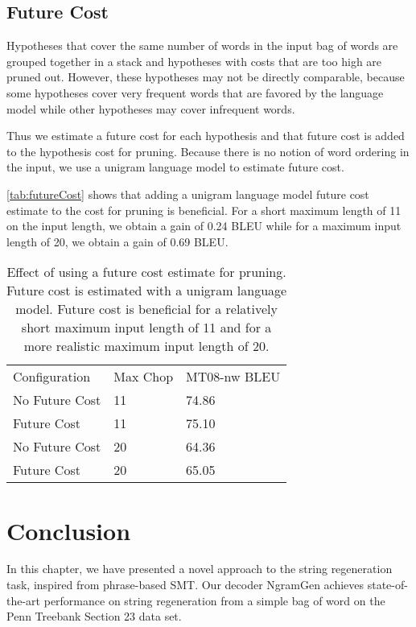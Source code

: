 \subsection{Future Cost}
\label{sec:gytoFutureCost}

Hypotheses that cover the same number of words in the input
bag of words are grouped together in a stack and
hypotheses with costs that are too high are pruned out.
However, these hypotheses may not be directly comparable, because
some hypotheses cover very frequent words that are favored by the
language model while other hypotheses may cover infrequent words.

Thus we estimate a future cost for each hypothesis and that future
cost is added to the hypothesis cost for pruning. Because there
is no notion of word ordering in the input, we use a unigram
language model to estimate future cost.

\autoref{tab:futureCost} shows that adding a unigram language model
future cost estimate to the cost for pruning is beneficial.
For a short maximum length of 11 on the input length, we
obtain a gain of 0.24 BLEU while for a maximum input length
of 20, we obtain a gain of 0.69 BLEU.
%
\begin{table}
  \begin{center}
    \begin{tabular}{lll}
      Configuration & Max Chop & MT08-nw BLEU \\
      No Future Cost & 11 & 74.86 \\
      Future Cost & 11 & 75.10 \\
      No Future Cost & 20 & 64.36 \\
      Future Cost & 20 & 65.05 \\
    \end{tabular}
    \caption{Effect of using a future cost estimate for pruning.
    Future cost is estimated with a unigram language model.
    Future cost is beneficial for a relatively short maximum input
    length of 11 and for a more realistic maximum input length of 20.}
    \label{tab:futureCost}
  \end{center}
\end{table}

\section{Conclusion}

In this chapter, we have presented a novel approach to the string regeneration
task, inspired from phrase-based SMT. Our decoder NgramGen achieves state-of-the-art
performance on string regeneration from a simple bag of word on the Penn Treebank
Section 23 data set.

